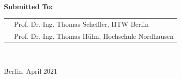 \begin{titlepage}
\begin{center}
    \vspace{1cm}

    \large \textbf{Submitted To:}\\
        \vspace{2mm}
		\begin{tabular}{rl}
			& Prof. Dr.-Ing. Thomas Scheffler, HTW Berlin\\
			& Prof. Dr.-Ing. Thomas Hühn, Hochschule Nordhausen\\
		\end{tabular}\\

    \vspace{2cm}

    \large Berlin, April 2021\\

  \end{center}
\end{titlepage}
